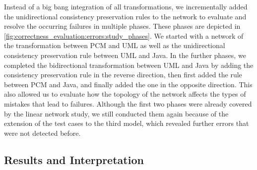 Instead of a big bang integration of all transformations, we incrementally added the unidirectional consistency preservation rules to the network to evaluate and resolve the occurring failures in multiple phases.
These phases are depicted in \autoref{fig:correctness_evaluation:errors:study_phases}.
We started with a network of the transformation between \gls{PCM} and \gls{UML} as well as the unidirectional consistency preservation rule between \gls{UML} and Java.
In the further phases, we completed the bidirectional transformation between \gls{UML} and Java by adding the consistency preservation rule in the reverse direction, then first added the rule between \gls{PCM} and Java, and finally added the one in the opposite direction.
This also allowed us to evaluate how the topology of the network affects the types of mistakes that lead to failures.
Although the first two phases were already covered by the linear network study, we still conducted them again because of the extension of the test cases to the third model, which revealed further errors that were not detected before.


\subsection{Results and Interpretation}

